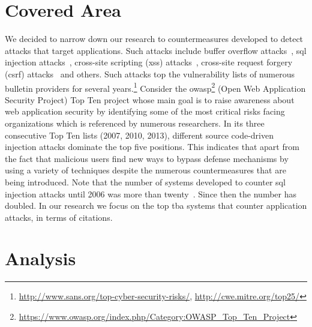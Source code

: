 \documentclass[conference]{IEEEtran}
\begin{document}
\section{Covered Area}

We decided to narrow down our
research to countermeasures developed to
detect attacks that target applications. Such attacks include
buffer overflow attacks~\cite{K11}, {\sc sql} injection
attacks~\cite{RL12b}, cross-site scripting ({\sc xss})
attacks~\cite{SG07}, cross-site request forgery ({\sc csrf})
attacks~\cite{LZRL09} and others.
Such attacks top the vulnerability lists of numerous bulletin providers for several
years.\footnote{\url{http://www.sans.org/top-cyber-security-risks/}, \url{http://cwe.mitre.org/top25/}}
Consider the {\sc owasp}\footnote{\url{https://www.owasp.org/index.php/Category:OWASP_Top_Ten_Project}}
(Open Web Application Security Project)
Top Ten project whose main goal is to raise awareness about
web application security by identifying some of the most critical risks facing
organizations which is referenced by numerous researchers.
In its three consecutive Top Ten lists (2007, 2010, 2013), different
source code-driven injection attacks dominate the top five positions.
This indicates that
apart from the fact that malicious users find new ways to bypass
defense mechanisms by using a variety of techniques despite the numerous
countermeasures that are being introduced.
Note that the number of systems developed to counter {\sc sql}
injection attacks until 2006 was more than twenty~\cite{HVO06}.
Since then the number has doubled.
In our research we focus on the top {\sc tba} systems that counter
application attacks, in terms of citations.

\section{Analysis}
\end{document}
